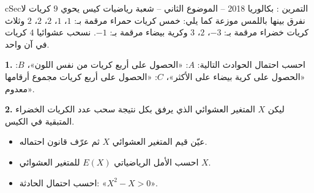 \documentclass[12pt,a4paper]{article}
\newenvironment{BOX}[2]{\begin{otherlanguage}{english}\begin{arbox}{#1}{#2}}{\end{arbox}\end{otherlanguage}}
\newcounter{exo}
\newenvironment{tamrin}[1]{\stepcounter{exo}\begin{BOX}{cSec}{التمرين \theexo: #1}}{\end{BOX}}
\newenvironment{sq}{\begin{itemize}[leftmargin=2.4em,itemsep=3pt]}{\end{itemize}}
\newcommand{\qa}{\item[(أ)]}\newcommand{\qb}{\item[(ب)]}\newcommand{\qc}{\item[(جـ)]}\newcommand{\qd}{\item[(د)]}\newcommand{\qe}{\item[(هـ)]}
\newcommand{\QQ}[1]{\par\smallskip\textbf{#1.} }
\begin{document}
\begin{tamrin}{بكالوريا 2018 -- الموضوع الثاني -- شعبة رياضيات}
كيس يحوي $9$ كريات لا نفرق بينها باللمس موزعة كما يلي:
خمس كريات حمراء مرقمة بـ: $1$، $1$، $2$، $2$، $2$ وثلاث كريات خضراء مرقمة بـ: $-3$، $2$، $3$ وكرية بيضاء مرقمة بـ: $-1$.
نسحب عشوائيا $4$ كريات في آن واحد.

\QQ{1} احسب احتمال الحوادث التالية:
$A$: «الحصول على أربع كريات من نفس اللون»، $B$: «الحصول على كرية بيضاء على الأكثر»، $C$: «الحصول على أربع كريات مجموع أرقامها معدوم».
\QQ{2} ليكن $X$ المتغير العشوائي الذي يرفق بكل نتيجة سحب عدد الكريات الخضراء المتبقية في الكيس.
\begin{sq}
\qa عيّن قيم المتغير العشوائي $X$ ثم عرّف قانون احتماله.
\qb احسب الأمل الرياضياتي $E(X)$ للمتغير العشوائي $X$.
\qc احسب احتمال الحادثة: «$X^2-X>0$».
\end{sq}
\end{tamrin}
\end{document}
